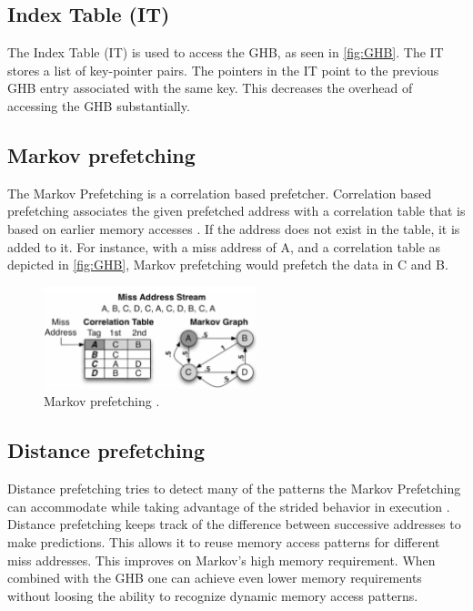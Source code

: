 \documentclass[conference]{IEEEtran}
\begin{document}
\subsection{Index Table (IT)}
The Index Table (IT) is used to access the GHB, as seen in \cref{fig:GHB}. The IT stores a list of key-pointer pairs. The pointers in the IT point to the previous GHB entry associated with the same key. This decreases the overhead of accessing the GHB substantially.

\subsection{Markov prefetching}
The Markov Prefetching is a correlation based prefetcher. Correlation based prefetching associates the given prefetched address with a correlation table that is based on earlier memory accesses \cite{b10}. If the address does not exist in the table, it is added to it. For instance, with a miss address of A, and a correlation table as depicted in \cref{fig:GHB}, Markov prefetching would prefetch the data in C and B. 

\begin{figure}[H]
    \centering
     \includegraphics[width=62mm]{assets/markov-prefetch.png}
    \vspace{-2mm}
    \caption{Markov prefetching \cite{b1}.}
    \label{fig:Markov}
\end{figure}

\subsection{Distance prefetching}
Distance prefetching tries to detect many of the patterns the Markov Prefetching can accommodate while taking advantage of the strided behavior in execution \cite{b2}. Distance prefetching keeps track of the difference between successive addresses to make predictions. This allows it to reuse memory access patterns for different miss addresses. This improves on Markov's high memory requirement. When combined with the GHB one can achieve even lower memory requirements without loosing the ability to recognize dynamic memory access patterns.
\end{document}
